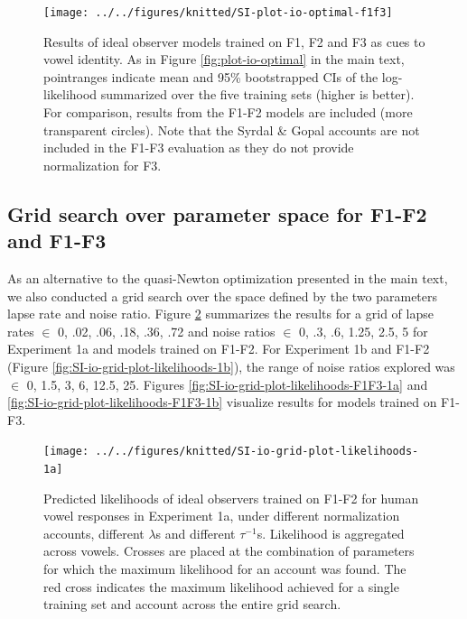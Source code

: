 \documentclass[preprint]{JASA}
\begin{document}
\begin{figure}

{\centering \texttt{[image: ../../figures/knitted/SI-plot-io-optimal-f1f3]} 

}

\caption{Results of ideal observer models trained on F1, F2 and F3 as cues to vowel identity. As in Figure \ref{fig:plot-io-optimal} in the main text, pointranges indicate mean and 95\% bootstrapped CIs of the log-likelihood summarized over the five training sets (higher is better). For comparison, results from the F1-F2 models are included (more transparent circles). Note that the Syrdal \& Gopal accounts are not included in the F1-F3 evaluation as they do not provide normalization for F3.}\label{fig:SI-plot-io-optimal-f1f3}
\end{figure}

\subsection{Grid search over parameter space for F1-F2 and F1-F3}\label{sec:SI-study1-grid-search}

As an alternative to the quasi-Newton optimization presented in the main text, we also conducted a grid search over the space defined by the two parameters lapse rate and noise ratio. Figure \ref{fig:SI-io-grid-plot-likelihoods-1a} summarizes the results for a grid of lapse rates \(\in\) 0, .02, .06, .18, .36, .72 and noise ratios \(\in\) 0, .3, .6, 1.25, 2.5, 5 for Experiment 1a and models trained on F1-F2. For Experiment 1b and F1-F2 (Figure \ref{fig:SI-io-grid-plot-likelihoods-1b}), the range of noise ratios explored was \(\in\) 0, 1.5, 3, 6, 12.5, 25. Figures \ref{fig:SI-io-grid-plot-likelihoods-F1F3-1a} and \ref{fig:SI-io-grid-plot-likelihoods-F1F3-1b} visualize results for models trained on F1-F3.



\begin{figure}

{\centering \texttt{[image: ../../figures/knitted/SI-io-grid-plot-likelihoods-1a]} 

}

\caption{Predicted likelihoods of ideal observers trained on F1-F2 for human vowel responses in Experiment 1a, under different normalization accounts, different \(\lambda\)s and different \(\tau^{-1}\)s. Likelihood is aggregated across vowels. Crosses are placed at the combination of parameters for which the maximum likelihood for an account was found. The red cross indicates the maximum likelihood achieved for a single training set and account across the entire grid search.}\label{fig:SI-io-grid-plot-likelihoods-1a}
\end{figure}
\end{document}

